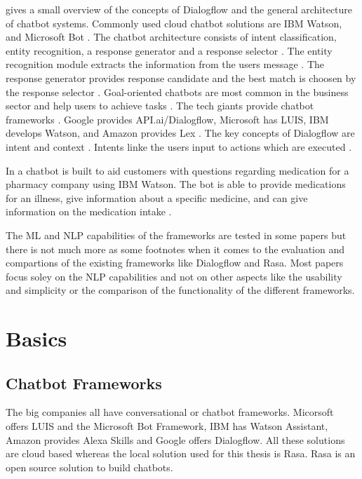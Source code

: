 \documentclass[12pt, backref]{report}
\begin{document}
\citet{rahman2017programming} gives a small overview of the concepts of Dialogflow and the general architecture of chatbot systems.
Commonly used cloud chatbot solutions are IBM Watson, and Microsoft Bot \cite{rahman2017programming}.
The chatbot architecture consists of intent classification, entity recognition, a response generator and a response selector \cite{rahman2017programming}. 
The entity recognition module extracts the information from the users message \cite{rahman2017programming}.
The response generator provides response candidate and the best match is choosen by the response selector \cite{rahman2017programming}.
Goal-oriented chatbots are most common in the business sector and help users to achieve tasks \cite{rahman2017programming}.
The tech giants provide chatbot frameworks \cite{rahman2017programming}. Google provides API.ai/Dialogflow, Microsoft has LUIS, IBM develops Watson, and Amazon provides Lex \cite{rahman2017programming}.
The key concepts of Dialogflow are intent and context \cite{rahman2017programming}.
Intents linke the users input to actions which are executed \cite{rahman2017programming}.

In \citet{pharmacybot} a chatbot is built to aid customers with questions regarding medication for a pharmacy company using IBM Watson.
The bot is able to provide medications for an illness, give information about a specific medicine, and can give information on the medication intake \cite{pharmacybot}.



The ML and NLP capabilities of the frameworks are tested in some papers but there is not much more as some footnotes when it comes to the evaluation and compartions of the existing frameworks like Dialogflow and Rasa.
Most papers focus soley on the NLP capabilities and not on other aspects like the usability and simplicity or the comparison of the functionality of the different frameworks.


\chapter{Basics}    %

\section{Chatbot Frameworks}
The big companies all have conversational or chatbot frameworks.
Micorsoft offers LUIS and the Microsoft Bot Framework, IBM has Watson Assistant, Amazon provides Alexa Skills and Google offers Dialogflow.
All these solutions are cloud based whereas the local solution used for this thesis is Rasa. Rasa is an open source solution to build chatbots.
\end{document}
